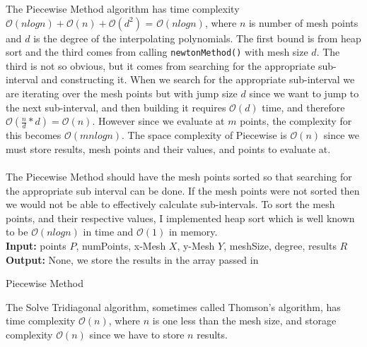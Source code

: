 \documentclass[12pt]{article}
\theoremstyle{remark}
\begin{document}
The Piecewise Method algorithm has time complexity $\mathcal{O}(nlogn) + \mathcal{O}(n) + \mathcal{O}(d^2)$ = $\mathcal{O}(nlogn)$, where $n$ is number of mesh points and $d$ is the degree of the interpolating polynomials. The first bound is from heap sort and the third comes from calling \texttt{newtonMethod()} with mesh size $d$. The third is not so obvious, but it comes from searching for the appropriate sub-interval and constructing it. When we search for the appropriate sub-interval we are iterating over the mesh points but with jump size $d$ since we want to jump to the next sub-interval, and then building it requires $\mathcal{O}(d)$ time, and therefore $\mathcal{O}(\frac{n}{d} * d) = \mathcal{O}(n)$. However since we evaluate at $m$ points, the complexity for this becomes $\mathcal{O}(mnlogn)$. The space complexity of Piecewise is $\mathcal{O}(n)$ since we must store results, mesh points and their values, and points to evaluate at. \\ \\
The Piecewise Method should have the mesh points sorted so that searching for the appropriate sub interval can be done. If the mesh points were not sorted then we would not be able to effectively calculate sub-intervals. To sort the mesh points, and their respective values, I implemented heap sort which is well known to be $\mathcal{O}(nlogn)$ in time and $\mathcal{O}(1)$ in memory. \\

\textbf{Input: } points $P$, numPoints, x-Mesh $X$, y-Mesh $Y$, meshSize, degree, results $R$ \\
\textbf{Output:} None, we store the results in the array passed in
\begin{algorithm}[H]
	\caption{Piecewise Method}
	\begin{algorithmic}[1]	
		\EndFor
		\EndIf
		\EndFor
		\EndFor
	\end{algorithmic}
\end{algorithm}

The Solve Tridiagonal algorithm, sometimes called Thomson's algorithm, has time complexity $\mathcal{O}(n)$, where $n$ is one less than the mesh size, and storage complexity $\mathcal{O}(n)$ since we have to store $n$ results. \\
\end{document}
